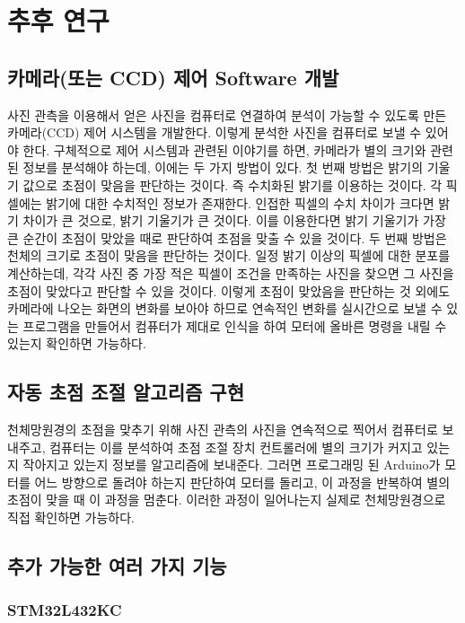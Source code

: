 \section{추후 연구}

\subsection{카메라(또는 CCD) 제어 Software 개발}

사진 관측을 이용해서 얻은 사진을 컴퓨터로 연결하여 분석이 가능할 수 있도록 만든 카메라(CCD) 제어 시스템을 개발한다. 이렇게 분석한 사진을 컴퓨터로 보낼 수 있어야 한다. 구체적으로 제어 시스템과 관련된 이야기를 하면, 카메라가 별의 크기와 관련된 정보를 분석해야 하는데, 이에는 두 가지 방법이 있다. 첫 번째 방법은 밝기의 기울기 값으로 초점이 맞음을 판단하는 것이다. 즉 수치화된 밝기를 이용하는 것이다. 각 픽셀에는 밝기에 대한 수치적인 정보가 존재한다. 인접한 픽셀의 수치 차이가 크다면 밝기 차이가 큰 것으로, 밝기 기울기가 큰 것이다. 이를 이용한다면 밝기 기울기가 가장 큰 순간이 초점이 맞았을 때로 판단하여 초점을 맞출 수 있을 것이다. 두 번째 방법은 천체의 크기로 초점이 맞음을 판단하는 것이다. 일정 밝기 이상의 픽셀에 대한 분포를 계산하는데, 각각 사진 중 가장 적은 픽셀이 조건을 만족하는 사진을 찾으면 그 사진을 초점이 맞았다고 판단할 수 있을 것이다. 이렇게 초점이 맞았음을 판단하는 것 외에도 카메라에 나오는 화면의 변화를 보아야 하므로 연속적인 변화를 실시간으로 보낼 수 있는 프로그램을 만들어서 컴퓨터가 제대로 인식을 하여 모터에 올바른 명령을 내릴 수 있는지 확인하면 가능하다.

\subsection{자동 초점 조절 알고리즘 구현}

천체망원경의 초점을 맞추기 위해 사진 관측의 사진을 연속적으로 찍어서 컴퓨터로 보내주고, 컴퓨터는 이를 분석하여 초점 조절 장치 컨트롤러에 별의 크기가 커지고 있는지 작아지고 있는지 정보를 알고리즘에 보내준다. 그러면 프로그래밍 된 Arduino가 모터를 어느 방향으로 돌려야 하는지 판단하여 모터를 돌리고, 이 과정을 반복하여 별의 초점이 맞을 때 이 과정을 멈춘다. 이러한 과정이 일어나는지 실제로 천체망원경으로 직접 확인하면 가능하다.

\subsection{추가 가능한 여러 가지 기능}

\subsubsection{STM32L432KC}

